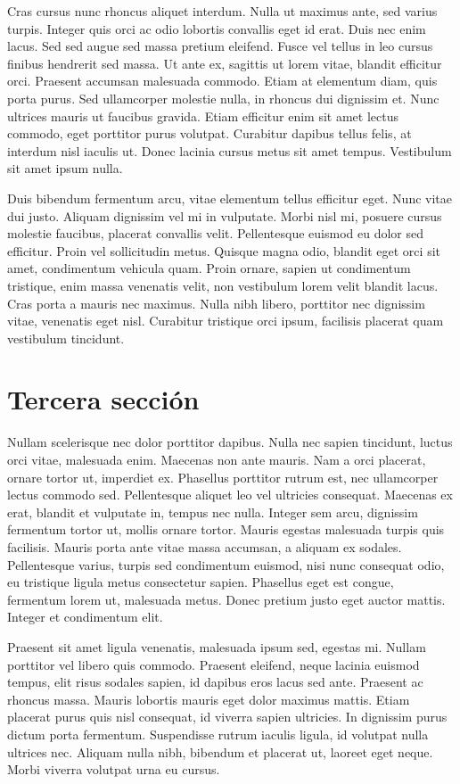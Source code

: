 \documentclass[a4paper,twoside=false,12pt,spanish,DIV=7]{scrbook}
\begin{document}
Cras cursus nunc rhoncus aliquet interdum. Nulla ut maximus ante, sed varius turpis. Integer quis orci ac odio lobortis convallis eget id erat. Duis nec enim lacus. Sed sed augue sed massa pretium eleifend. Fusce vel tellus in leo cursus finibus hendrerit sed massa. Ut ante ex, sagittis ut lorem vitae, blandit efficitur orci. Praesent accumsan malesuada commodo. Etiam at elementum diam, quis porta purus. Sed ullamcorper molestie nulla, in rhoncus dui dignissim et. Nunc ultrices mauris ut faucibus gravida. Etiam efficitur enim sit amet lectus commodo, eget porttitor purus volutpat. Curabitur dapibus tellus felis, at interdum nisl iaculis ut. Donec lacinia cursus metus sit amet tempus. Vestibulum sit amet ipsum nulla.

Duis bibendum fermentum arcu, vitae elementum tellus efficitur eget. Nunc vitae dui justo. Aliquam dignissim vel mi in vulputate. Morbi nisl mi, posuere cursus molestie faucibus, placerat convallis velit. Pellentesque euismod eu dolor sed efficitur. Proin vel sollicitudin metus. Quisque magna odio, blandit eget orci sit amet, condimentum vehicula quam. Proin ornare, sapien ut condimentum tristique, enim massa venenatis velit, non vestibulum lorem velit blandit lacus. Cras porta a mauris nec maximus. Nulla nibh libero, porttitor nec dignissim vitae, venenatis eget nisl. Curabitur tristique orci ipsum, facilisis placerat quam vestibulum tincidunt.

\section{Tercera sección}

Nullam scelerisque nec dolor porttitor dapibus. Nulla nec sapien tincidunt, luctus orci vitae, malesuada enim. Maecenas non ante mauris. Nam a orci placerat, ornare tortor ut, imperdiet ex. Phasellus porttitor rutrum est, nec ullamcorper lectus commodo sed. Pellentesque aliquet leo vel ultricies consequat. Maecenas ex erat, blandit et vulputate in, tempus nec nulla. Integer sem arcu, dignissim fermentum tortor ut, mollis ornare tortor. Mauris egestas malesuada turpis quis facilisis. Mauris porta ante vitae massa accumsan, a aliquam ex sodales. Pellentesque varius, turpis sed condimentum euismod, nisi nunc consequat odio, eu tristique ligula metus consectetur sapien. Phasellus eget est congue, fermentum lorem ut, malesuada metus. Donec pretium justo eget auctor mattis. Integer et condimentum elit.

Praesent sit amet ligula venenatis, malesuada ipsum sed, egestas mi. Nullam porttitor vel libero quis commodo. Praesent eleifend, neque lacinia euismod tempus, elit risus sodales sapien, id dapibus eros lacus sed ante. Praesent ac rhoncus massa. Mauris lobortis mauris eget dolor maximus mattis. Etiam placerat purus quis nisl consequat, id viverra sapien ultricies. In dignissim purus dictum porta fermentum. Suspendisse rutrum iaculis ligula, id volutpat nulla ultrices nec. Aliquam nulla nibh, bibendum et placerat ut, laoreet eget neque. Morbi viverra volutpat urna eu cursus.
\end{document}
